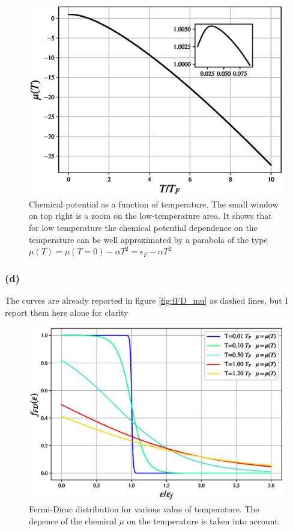 \documentclass{article}
\begin{document}
\begin{figure}[hbtp]
    \centering 
    \includegraphics[scale=0.7]{scripts/mu_T.eps}
    \caption{Chemical potential as a function of temperature. The small window on top right is a zoom on the low-temperature area. It shows that for low temperature
    the chemical potential dependence on the temperature can be well approximated by a parabola of the type $\mu(T) = \mu(T=0) - \alpha T^2 = \epsilon_F - \alpha T^2$}
    \label{fig:chemical_potential}
\end{figure}

\subsubsection*{(d)}
The curves are already reported in figure \ref{fig:fFD_mu} as dashed lines, but I report them here alone for clarity
\begin{figure}
    \centering
    \includegraphics[scale=0.5]{scripts/f_fd_mu_T.eps}
    \caption{Fermi-Dirac distribution for various value of temperature. The depence of the chemical $\mu$ on the temperature is taken into account.}
    \label{fig:fFD_mu_T}
\end{figure}
\end{document}
